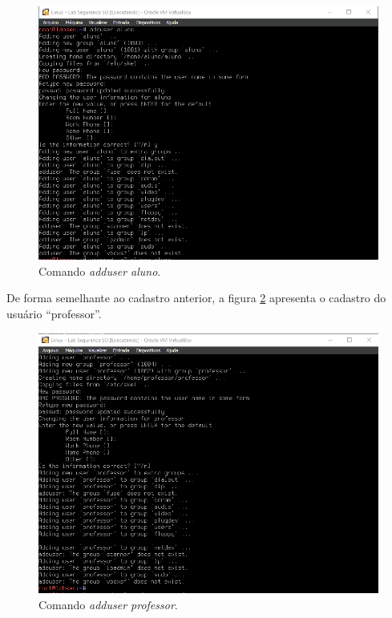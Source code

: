 \documentclass[
    12pt,				%
    oneside,   	        %
    a4paper,			%
    english,			%
    french,				%
    spanish,			%
    brazil,				%
    ]{pacotes/abntex2}
\begin{document}
\begin{figure}[H]
  \centering
  \includegraphics[scale=0.8]{figuras/adduser_aluno.png}
  \caption{Comando \textit{adduser aluno}.}
  \label{fig:add_aluno}
\end{figure}

De forma semelhante ao cadastro anterior, a figura \ref{fig:add_prof} apresenta o cadastro do usuário ``professor''.

\begin{figure}[H]
  \centering
  \includegraphics[scale=0.8]{figuras/adduser_prof.png}
  \caption{Comando \textit{adduser professor}.}
  \label{fig:add_prof}
\end{figure}
\end{document}
